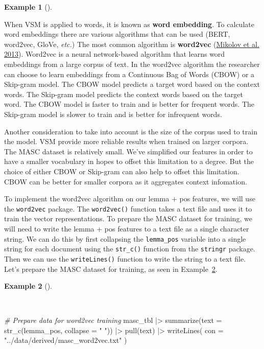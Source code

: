 \documentclass[
  letterpaper,
  DIV=11,
  numbers=noendperiod]{scrreport}
\newenvironment{Shaded}{\begin{snugshade}}{\end{snugshade}}
\newcommand{\AttributeTok}[1]{\textcolor[rgb]{0.00,0.00,0.00}{#1}}
\newcommand{\CommentTok}[1]{\textcolor[rgb]{0.00,0.00,0.00}{\textit{#1}}}
\newcommand{\FunctionTok}[1]{\textcolor[rgb]{0.00,0.00,0.00}{#1}}
\newcommand{\NormalTok}[1]{\textcolor[rgb]{0.00,0.00,0.00}{#1}}
\newcommand{\SpecialCharTok}[1]{\textcolor[rgb]{0.00,0.00,0.00}{#1}}
\newcommand{\StringTok}[1]{\textcolor[rgb]{0.00,0.00,0.00}{#1}}
\theoremstyle{definition}
\newtheorem{example}{Example}[chapter]
\theoremstyle{remark}
\begin{document}
\begin{example}[]
\end{example}

When VSM is applied to words, it is known as \textbf{word embedding}. To
calculate word embeddings there are various algorithms that can be used
(BERT, word2vec, GloVe, \emph{etc.}) The most common algorithm is
\textbf{word2vec} (\protect\hyperlink{ref-Mikolov2013b}{Mikolov et al.
2013}). Word2vec is a neural network-based algorithm that learns word
embeddings from a large corpus of text. In the word2vec algorithm the
researcher can choose to learn embeddings from a Continuous Bag of Words
(CBOW) or a Skip-gram model. The CBOW model predicts a target word based
on the context words. The Skip-gram model predicts the context words
based on the target word. The CBOW model is faster to train and is
better for frequent words. The Skip-gram model is slower to train and is
better for infrequent words.

Another consideration to take into account is the size of the corpus
used to train the model. VSM provide more reliable results when trained
on larger corpora. The MASC dataset is relatively small. We've
simplified our features in order to have a smaller vocabulary in hopes
to offset this limitation to a degree. But the choice of either CBOW or
Skip-gram can also help to offset this limitation. CBOW can be better
for smaller corpora as it aggregates context infomation.

To implement the word2vec algorithm on our lemma + pos features, we will
use the \texttt{word2vec} package. The \texttt{word2vec()} function
takes a text file and uses it to train the vector representations. To
prepare the MASC dataset for training, we will need to write the lemma +
pos features to a text file as a single character string. We can do this
by first collapsing the \texttt{lemma\_pos} variable into a single
string for each document using the \texttt{str\_c()} function from the
\texttt{stringr} package. Then we can use the \texttt{writeLines()}
function to write the string to a text file. Let's prepare the MASC
dataset for training, as seen in
Example~\ref{exm-eda-masc-vsm-word2vec-text}.

\begin{example}[]\protect\hypertarget{exm-eda-masc-vsm-word2vec-text}{}\label{exm-eda-masc-vsm-word2vec-text}

~

\begin{Shaded}
\begin{Highlighting}[]
\CommentTok{\# Prepare data for word2vec training}
\NormalTok{masc\_tbl }\SpecialCharTok{|\textgreater{}} 
  \FunctionTok{summarize}\NormalTok{(}\AttributeTok{text =} \FunctionTok{str\_c}\NormalTok{(lemma\_pos, }\AttributeTok{collapse =} \StringTok{" "}\NormalTok{)) }\SpecialCharTok{|\textgreater{}} 
  \FunctionTok{pull}\NormalTok{(text) }\SpecialCharTok{|\textgreater{}} 
  \FunctionTok{writeLines}\NormalTok{(}
    \AttributeTok{con =} \StringTok{"../data/derived/masc\_word2vec.txt"}
\NormalTok{  )}
\end{Highlighting}
\end{Shaded}

\end{example}
\end{document}
